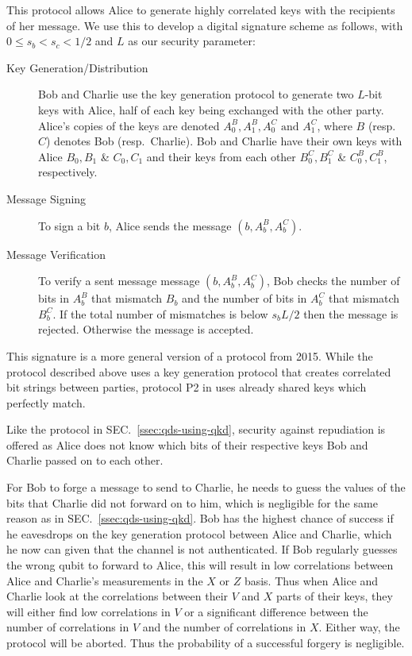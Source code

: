 \documentclass[%
 reprint,
 amsmath,amssymb,
 aps,
 pra,
]{revtex4-1}
\begin{document}
This protocol allows Alice to generate highly correlated keys with the recipients of her message. We use this to develop a digital signature scheme as follows, with $0 \leq s_b < s_c < 1/2$ and $L$ as our security parameter:

\begin{description}
\item[Key Generation/Distribution]Bob and Charlie use the key generation protocol to generate two $L$-bit keys with Alice, half of each key being exchanged with the other party. Alice's copies of the keys are denoted $A^B_0, A^B_1, A^C_0 \text{ and } A^C_1$, where $B$ (resp.\ $C$) denotes Bob (resp.\ Charlie). Bob and Charlie have their own keys with Alice $B_0, B_1$ \& $C_0, C_1$ and their keys from each other $B^C_0, B^C_1$ \& $C^B_0, C^B_1$, respectively.
\item[Message Signing]To sign a bit $b$, Alice sends the message $(b, A^B_b, A^C_b)$.
\item[Message Verification]To verify a sent message message $(b, A^B_b, A^C_b)$, Bob checks the number of bits in $A^B_b$ that mismatch $B_b$ and the number of bits in $A^C_b$ that mismatch $B^C_b$. If the total number of mismatches is below $s_bL/2$ then the message is rejected. Otherwise the message is accepted.
\end{description}

This signature is a more general version of a protocol from 2015. While the protocol described above uses a key generation protocol that creates correlated bit strings between parties, protocol P2 in \cite{PhysRevA.91.042304} uses already shared keys which perfectly match.

Like the protocol in SEC.\ \ref{ssec:qds-using-qkd}, security against repudiation is offered as Alice does not know which bits of their respective keys Bob and Charlie passed on to each other.

For Bob to forge a message to send to Charlie, he needs to guess the values of the bits that Charlie did not forward on to him, which is negligible for the same reason as in SEC.\ \ref{ssec:qds-using-qkd}. Bob has the highest chance of success if he eavesdrops on the key generation protocol between Alice and Charlie, which he now can given that the channel is not authenticated. If Bob regularly guesses the wrong qubit to forward to Alice, this will result in low correlations between Alice and Charlie's measurements in the $X$ or $Z$ basis. Thus when Alice and Charlie look at the correlations between their $V$ and $X$ parts of their keys, they will either find low correlations in $V$ or a significant difference between the number of correlations in $V$ and the number of correlations in $X$. Either way, the protocol will be aborted. Thus the probability of a successful forgery is negligible.
\end{document}
